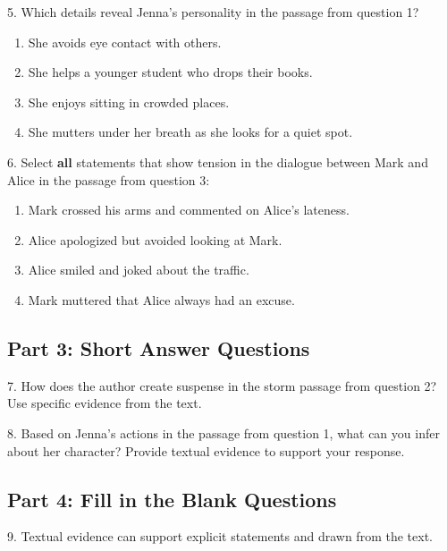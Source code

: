 \documentclass[12pt]{article}
\begin{document}
\vspace{1cm}

5. Which details reveal Jenna’s personality in the passage from question 1?  
\begin{enumerate}[label=\Alph*.]
    \item She avoids eye contact with others.  
    \item She helps a younger student who drops their books.  
    \item She enjoys sitting in crowded places.  
    \item She mutters under her breath as she looks for a quiet spot.  
\end{enumerate}

\vspace{1cm}

6. Select \textbf{all} statements that show tension in the dialogue between Mark and Alice in the passage from question 3:  
\begin{enumerate}[label=\Alph*.]
    \item Mark crossed his arms and commented on Alice’s lateness.  
    \item Alice apologized but avoided looking at Mark.  
    \item Alice smiled and joked about the traffic.  
    \item Mark muttered that Alice always had an excuse.  
\end{enumerate}

\vspace{1cm}
\newpage
\subsection*{Part 3: Short Answer Questions}

7. How does the author create suspense in the storm passage from question 2? Use specific evidence from the text.  
\vspace{4cm}

8. Based on Jenna’s actions in the passage from question 1, what can you infer about her character? Provide textual evidence to support your response.  
\vspace{4cm}

\subsection*{Part 4: Fill in the Blank Questions}
\vspace{1cm}
9. Textual evidence can support explicit statements and \underline{\hspace{4cm}} drawn from the text.  
\vspace{2cm}
\end{document}
